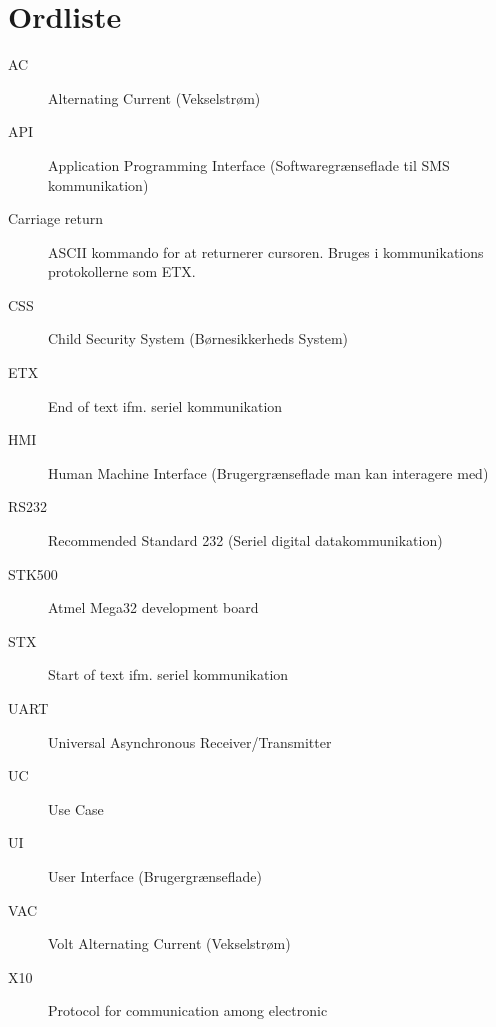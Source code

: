 \chapter{Ordliste}

\begin{description}

\item[AC] Alternating Current (Vekselstrøm)
\item[API] Application Programming Interface (Softwaregrænseflade til SMS kommunikation)
\item[Carriage return] ASCII kommando for at returnerer cursoren. Bruges i kommunikations protokollerne som ETX.
\item[CSS] Child Security System (Børnesikkerheds System)
\item[ETX] End of text ifm. seriel kommunikation
\item[HMI] Human Machine Interface (Brugergrænseflade man kan interagere med)
\item[RS232] Recommended Standard 232 (Seriel digital datakommunikation)
\item[STK500] Atmel Mega32 development board
\item[STX] Start of text ifm. seriel kommunikation
\item[UART] Universal Asynchronous Receiver/Transmitter
\item[UC] Use Case
\item[UI] User Interface (Brugergrænseflade)
\item[VAC] Volt Alternating Current (Vekselstrøm)
\item[X10] Protocol for communication among electronic

\end{description}